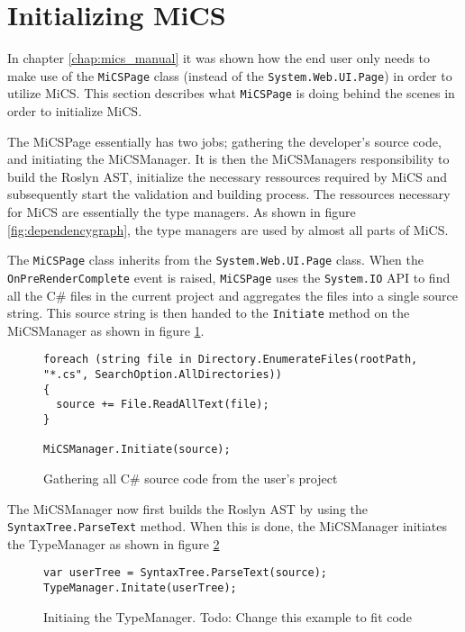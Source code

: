 \section{Initializing MiCS} %
\label{sec:initializing_mics}

In chapter \ref{chap:mics_manual} it was shown how the end user only needs to make use of the \texttt{MiCSPage} class (instead of the \texttt{System.Web.UI.Page}) in order to utilize MiCS. This section describes what \texttt{MiCSPage} is doing behind the scenes in order to initialize MiCS.

The MiCSPage essentially has two jobs; gathering the developer's source code, and initiating the MiCSManager. It is then the MiCSManagers responsibility to build the Roslyn AST, initialize the necessary ressources required by MiCS and subsequently start the validation and building process. The ressources necessary for MiCS are essentially the type managers. As shown in figure \ref{fig:dependencygraph}, the type managers are used by almost all parts of MiCS.

The \texttt{MiCSPage} class inherits from the \texttt{System.Web.UI.Page} class. When the \texttt{OnPreRenderComplete} event is raised, \texttt{MiCSPage} uses the \texttt{System.IO} API to find all the C\# files in the current project and aggregates the files into a single source string. This source string is then handed to the \texttt{Initiate} method on the MiCSManager as shown in figure \ref{fig:init_mics_gather_source_code}.

\begin{figure}[H]
\begin{lstlisting}[language=CSharp,classoffset=1,morekeywords={Directory,SearcOption,File,MiCSManager,ScriptManager}]
foreach (string file in Directory.EnumerateFiles(rootPath, "*.cs", SearchOption.AllDirectories))
{
  source += File.ReadAllText(file);
}

MiCSManager.Initiate(source);
\end{lstlisting}
\caption{Gathering all C\# source code from the user's project}
\label{fig:init_mics_gather_source_code}
\end{figure}

The MiCSManager now first builds the Roslyn AST by using the \texttt{SyntaxTree.ParseText} method. When this is done, the MiCSManager initiates the TypeManager as shown in figure \ref{fig:init_mics_init_typemanager}

\begin{figure}[H]
\begin{lstlisting}[language=CSharp,classoffset=1,morekeywords={TypeManager,SyntaxTree}]
var userTree = SyntaxTree.ParseText(source);
TypeManager.Initate(userTree);
\end{lstlisting}
\caption{Initiaing the TypeManager. Todo: Change this example to fit code}
\label{fig:init_mics_init_typemanager}
\end{figure}


